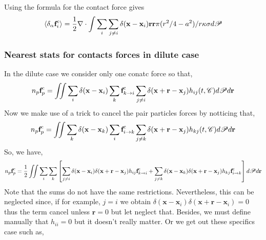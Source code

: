 Using the formula for the contact force gives 
\begin{align}    
    \left<\delta_\alpha \textbf{f}_i^c\right>
    &= \frac{1}{2}\mathbf{\nabla}\cdot \int \sum_{i} \sum_{j \neq i} \delta(\textbf{x}-\textbf{x}_i) 
    \textbf{r}\textbf{r}
    \pi (r^2/4 - a^2) /r \kappa \sigma d\mathscr{P} 
    \\
\end{align}


\subsubsection*{Nearest stats for contacts forces in dilute case}
In the dilute case we consider only one conatc force so that, 
\begin{equation}
    n_p \textbf{f}^c_p = \iint 
    \sum_i 
    \delta(\textbf{x} -\textbf{x}_i)
    \sum_k 
    \textbf{f}_{k \to i}^\text{c} 
    \sum_{j\neq i}
    \delta(\textbf{x} + \textbf{r} -\textbf{x}_j) h_{ij}(t,\mathscr{C})
    d\mathscr{P} d\textbf{r}\\
\end{equation}
Now we make use of a trick to cancel the pair particles forces by notticing that, 
\begin{equation}
    n_p \textbf{f}^c_p = \iint 
    \sum_k 
    \delta(\textbf{x} -\textbf{x}_k)
    \sum_i
    \textbf{f}_{i\to k}^\text{c} 
    \sum_{j\neq k}
    \delta(\textbf{x} + \textbf{r} -\textbf{x}_j) h_{kj}(t,\mathscr{C})
    d\mathscr{P} d\textbf{r}\\
\end{equation}
So, we have, 
\begin{equation}
    n_p \textbf{f}^c_p = \frac{1}{2}\iint 
    \sum_i 
    \sum_k 
    \left[
        \sum_{j\neq i}
        \delta(\textbf{x} -\textbf{x}_i)
        \delta(\textbf{x} + \textbf{r} -\textbf{x}_j) h_{ij}
        \textbf{f}_{k \to i}^\text{c} 
        +
        \sum_{j\neq k}
        \delta(\textbf{x} -\textbf{x}_k)
        \delta(\textbf{x} + \textbf{r} -\textbf{x}_j) h_{kj}
        \textbf{f}_{i \to k}^\text{c} 
    \right]
    d\mathscr{P} d\textbf{r}\\
\end{equation}
Note that the sums do not have the same restrictions. 
Nevertheless, this can be neglected since, if for example, $j=i$ we obtain $\delta(\textbf{x}-\textbf{x}_i)\delta(\textbf{x}+\textbf{r}-\textbf{x}_i) = 0$ thus the term cancel unless $\textbf{r}=0$ but let neglect that.
Besides, we must define manually that $h_{ii} = 0$ but it doesn't really matter.   
Or we get out these specifics case such as,
